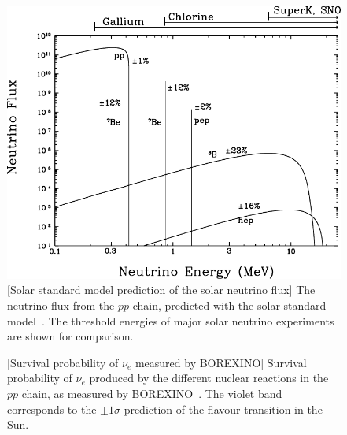 \begin{figure}
	\begin{minipage}[t]{0.48\textwidth}
		\includegraphics[width=\textwidth]{pics/BahcallNuFlux.pdf}
		[Solar standard model prediction of the solar neutrino flux]%
		{The neutrino flux from the $pp$ chain, predicted with the solar standard model~\cite{Bahcall:2004mz}.
		The threshold energies of major solar neutrino experiments are shown for comparison.}
		\label{fig:solar_nu_flux}
	\end{minipage}
	\hfill
	\begin{minipage}[t]{0.5\textwidth}
		\centering
		[Survival probability of $\nu_e$ measured by BOREXINO]%
		{Survival probability of $\nu_e$ produced by the different nuclear reactions in the $pp$ chain, %
		as measured by BOREXINO~\cite{Bellini:2014uqa}.
		The violet band corresponds to the $\pm1\sigma$ prediction of the flavour transition in the Sun.}
		\label{fig:borex}
	\end{minipage}
\end{figure}


